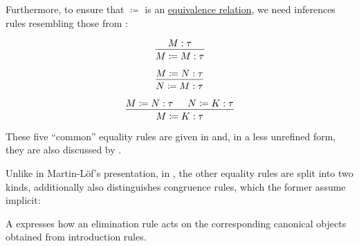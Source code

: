 \begin{remark}
\begin{thmenum}
    Furthermore, to ensure that \( {\coloneqq} \) is an \hyperref[def:equivalence_relation]{equivalence relation}, we need inferences rules resembling those from :
    \begingroup
    \begin{paracol}{3}
      \begin{nthcolumn}{0}
        \phantom{alignment hack}
        \begin{equation*}
          \begin{prooftree}
            \hypo{ M: \tau }
            \infer1{ M \coloneqq M: \tau }
          \end{prooftree}
        \end{equation*}
      \end{nthcolumn}

      \begin{nthcolumn}{1}
        \phantom{alignment hack}
        \begin{equation*}
          \begin{prooftree}
            \hypo{ M \coloneqq N: \tau }
            \infer1{ N \coloneqq M: \tau }
          \end{prooftree}
        \end{equation*}
      \end{nthcolumn}

      \begin{nthcolumn}{2}
        \phantom{alignment hack}
        \begin{equation*}
          \begin{prooftree}
            \hypo{ M \coloneqq N: \tau }
            \hypo{ N \coloneqq K: \tau }
            \infer2{ M \coloneqq K: \tau }
          \end{prooftree}
        \end{equation*}
      \end{nthcolumn}
    \end{paracol}
    \endgroup

    These five \enquote{common} equality rules are given in \cite[433]{UnivalentProject2024OctoberHoTT} and, in a less unrefined form, they are also discussed by .

    Unlike in Martin-L\"of's presentation, in \cite[27]{UnivalentProject2024OctoberHoTT}, the other equality rules are split into two kinds, additionally  also distinguishes congruence rules, which the former assume implicit:
    \begin{thmenum}
       A  expresses how an elimination rule acts on the corresponding canonical objects obtained from introduction rules.


\end{thmenum}
\end{thmenum}
\end{remark}
